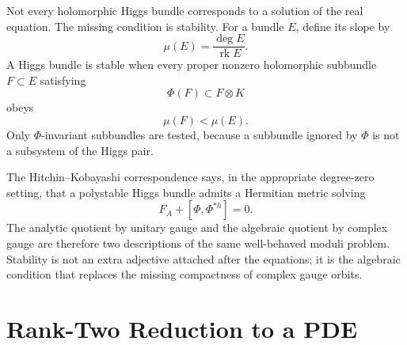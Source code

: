 Not every holomorphic Higgs bundle corresponds to a solution of the real equation.  The missing condition is stability.  For a bundle \(E\), define its slope by
\[
  \mu(E)=\frac{\deg E}{\operatorname{rk}E}.
\]
A Higgs bundle is stable when every proper nonzero holomorphic subbundle \(F\subset E\) satisfying
\[
  \Phi(F)\subset F\otimes K
\]
obeys
\[
  \mu(F)<\mu(E).
\]
Only \(\Phi\)-invariant subbundles are tested, because a subbundle ignored by \(\Phi\) is not a subsystem of the Higgs pair.

The Hitchin--Kobayashi correspondence says, in the appropriate degree-zero setting, that a polystable Higgs bundle admits a Hermitian metric solving
\[
  F_A+[\Phi,\Phi^{*h}]=0.
\]
The analytic quotient by unitary gauge and the algebraic quotient by complex gauge are therefore two descriptions of the same well-behaved moduli problem.  Stability is not an extra adjective attached after the equations; it is the algebraic condition that replaces the missing compactness of complex gauge orbits.

\section{Rank-Two Reduction to a PDE}

